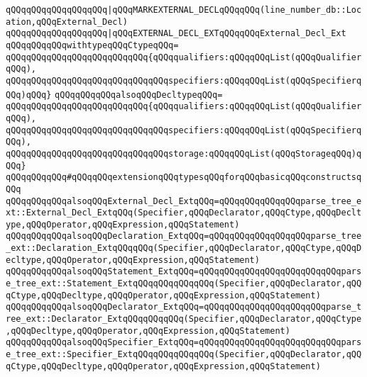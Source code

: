 \verb|qQQqqQQqqQQqqQQqqQQq|\verb#|qQQqMARKEXTERNAL_DECLqQQqqQQq(line_number_db::Location,qQQqExternal_Decl)#\newline
\verb|qQQqqQQqqQQqqQQqqQQq|\verb#|qQQqEXTERNAL_DECL_EXTqQQqqQQqExternal_Decl_Ext#\newline
\newline
\verb|qQQqqQQqqQQqwithtypeqQQqCtypeqQQq=|\newline
\verb|qQQqqQQqqQQqqQQqqQQqqQQqqQQq{qQQqqualifiers:qQQqqQQqList(qQQqQualifierqQQq),|\newline
\verb|qQQqqQQqqQQqqQQqqQQqqQQqqQQqqQQqspecifiers:qQQqqQQqList(qQQqSpecifierqQQq)qQQq}|\newline
\verb|qQQqqQQqqQQqalsoqQQqDecltypeqQQq=|\newline
\verb|qQQqqQQqqQQqqQQqqQQqqQQqqQQq{qQQqqualifiers:qQQqqQQqList(qQQqQualifierqQQq),|\newline
\verb|qQQqqQQqqQQqqQQqqQQqqQQqqQQqqQQqspecifiers:qQQqqQQqList(qQQqSpecifierqQQq),|\newline
\verb|qQQqqQQqqQQqqQQqqQQqqQQqqQQqqQQqstorage:qQQqqQQqList(qQQqStorageqQQq)qQQq}|\newline
\newline
\verb|qQQqqQQqqQQq#qQQqqQQqextensionqQQqtypesqQQqforqQQqbasicqQQqconstructsqQQq|\newline
\verb|qQQqqQQqqQQqalsoqQQqExternal_Decl_ExtqQQq=qQQqqQQqqQQqqQQqparse_tree_ext::External_Decl_ExtqQQq(Specifier,qQQqDeclarator,qQQqCtype,qQQqDecltype,qQQqOperator,qQQqExpression,qQQqStatement)|\newline
\verb|qQQqqQQqqQQqalsoqQQqDeclaration_ExtqQQq=qQQqqQQqqQQqqQQqqQQqparse_tree_ext::Declaration_ExtqQQqqQQq(Specifier,qQQqDeclarator,qQQqCtype,qQQqDecltype,qQQqOperator,qQQqExpression,qQQqStatement)|\newline
\verb|qQQqqQQqqQQqalsoqQQqStatement_ExtqQQq=qQQqqQQqqQQqqQQqqQQqqQQqqQQqparse_tree_ext::Statement_ExtqQQqqQQqqQQqqQQq(Specifier,qQQqDeclarator,qQQqCtype,qQQqDecltype,qQQqOperator,qQQqExpression,qQQqStatement)|\newline
\verb|qQQqqQQqqQQqalsoqQQqDeclarator_ExtqQQq=qQQqqQQqqQQqqQQqqQQqqQQqparse_tree_ext::Declarator_ExtqQQqqQQqqQQq(Specifier,qQQqDeclarator,qQQqCtype,qQQqDecltype,qQQqOperator,qQQqExpression,qQQqStatement)|\newline
\verb|qQQqqQQqqQQqalsoqQQqSpecifier_ExtqQQq=qQQqqQQqqQQqqQQqqQQqqQQqqQQqparse_tree_ext::Specifier_ExtqQQqqQQqqQQqqQQq(Specifier,qQQqDeclarator,qQQqCtype,qQQqDecltype,qQQqOperator,qQQqExpression,qQQqStatement)|\newline
